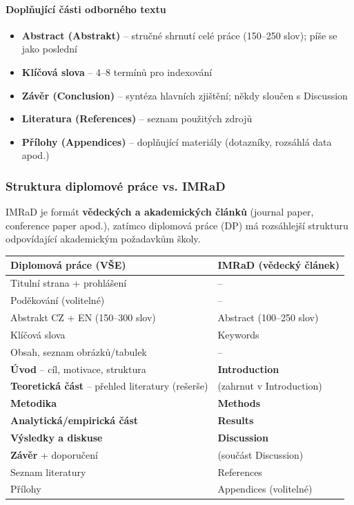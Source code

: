 \paragraph{Doplňující části odborného textu}
\begin{itemize}
  \item \textbf{Abstract (Abstrakt)} -- stručné shrnutí celé práce (150--250 slov); píše se jako poslední
  \item \textbf{Klíčová slova} -- 4--8 termínů pro indexování
  \item \textbf{Závěr (Conclusion)} -- syntéza hlavních zjištění; někdy sloučen s Discussion
  \item \textbf{Literatura (References)} -- seznam použitých zdrojů
  \item \textbf{Přílohy (Appendices)} -- doplňující materiály (dotazníky, rozsáhlá data apod.)
\end{itemize}

\subsubsection{Struktura diplomové práce vs. IMRaD}

IMRaD je formát \textbf{vědeckých a akademických článků} (journal paper, conference paper apod.), zatímco diplomová práce (DP) má rozsáhlejší strukturu odpovídající akademickým požadavkům školy.

\begin{center}
\begin{tabular}{p{5.5cm}p{5.5cm}}
\toprule
\textbf{Diplomová práce (VŠE)} & \textbf{IMRaD (vědecký článek)} \\
\midrule
Titulní strana + prohlášení & -- \\
Poděkování (volitelné) & -- \\
Abstrakt CZ + EN (150--300 slov) & Abstract (100--250 slov) \\
Klíčová slova & Keywords \\
Obsah, seznam obrázků/tabulek & -- \\
\textbf{Úvod} -- cíl, motivace, struktura & \textbf{Introduction} \\
\textbf{Teoretická část} -- přehled literatury (rešerše) & (zahrnut v Introduction) \\
\textbf{Metodika} & \textbf{Methods} \\
\textbf{Analytická/empirická část} & \textbf{Results} \\
\textbf{Výsledky a diskuse} & \textbf{Discussion} \\
\textbf{Závěr} + doporučení & (součást Discussion) \\
Seznam literatury & References \\
Přílohy & Appendices (volitelné) \\
\bottomrule
\end{tabular}
\end{center}

